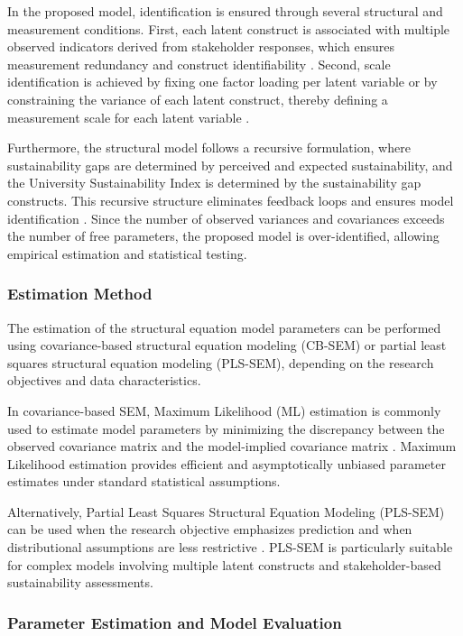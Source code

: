\documentclass[11pt,a4paper]{article}
\begin{document}
In the proposed model, identification is ensured through several structural and measurement conditions. First, each latent construct is associated with multiple observed indicators derived from stakeholder responses, which ensures measurement redundancy and construct identifiability \cite{Hair2022}. Second, scale identification is achieved by fixing one factor loading per latent variable or by constraining the variance of each latent construct, thereby defining a measurement scale for each latent variable \cite{Byrne2016}.

Furthermore, the structural model follows a recursive formulation, where sustainability gaps are determined by perceived and expected sustainability, and the University Sustainability Index is determined by the sustainability gap constructs. This recursive structure eliminates feedback loops and ensures model identification \cite{Kline2016}. Since the number of observed variances and covariances exceeds the number of free parameters, the proposed model is over-identified, allowing empirical estimation and statistical testing.

\subsubsection{Estimation Method}

The estimation of the structural equation model parameters can be performed using covariance-based structural equation modeling (CB-SEM) or partial least squares structural equation modeling (PLS-SEM), depending on the research objectives and data characteristics.

In covariance-based SEM, Maximum Likelihood (ML) estimation is commonly used to estimate model parameters by minimizing the discrepancy between the observed covariance matrix and the model-implied covariance matrix \cite{Kline2016,Byrne2016}. Maximum Likelihood estimation provides efficient and asymptotically unbiased parameter estimates under standard statistical assumptions.

Alternatively, Partial Least Squares Structural Equation Modeling (PLS-SEM) can be used when the research objective emphasizes prediction and when distributional assumptions are less restrictive \cite{Hair2022}. PLS-SEM is particularly suitable for complex models involving multiple latent constructs and stakeholder-based sustainability assessments.

\subsubsection{Parameter Estimation and Model Evaluation}
\end{document}
